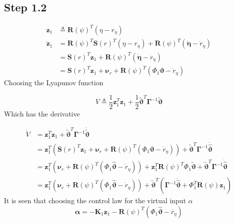 \documentclass[12pt,a4]{article}
\begin{document}
\subsection{Step 1.2}
\begin{align}
	\bm{z}_1       & \triangleq \bm{R}(\psi)^T(\eta - r_{\eta})                                                      \\
	\bm{\dot{z}}_1 & = \bm{R}(\psi)^T\bm{S}(r)^T(\eta - r_{\eta}) + \bm{R}(\psi)^T(\bm{\dot{\eta}} - \dot{r}_{\eta}) \\
	               & = \bm{S}(r)^T\bm{z}_1 + \bm{R}(\psi)^T(\bm{\dot{\eta}} - \dot{r}_{\eta})                        \\
	               & = \bm{S}(r)^T\bm{z}_1 + \bm{\nu}_r + \bm{R}(\psi)^T(\Phi_1\bm{\vartheta}- \dot{r}_{\eta})
\end{align}
Choosing the Lyapunov function

\begin{equation}
	V \triangleq \frac{1}{2}\bm{z}_1^T\bm{z}_1 + \frac{1}{2}\bm{\tilde{\vartheta}}^T\bm{\Gamma}^{-1}\bm{\tilde{\vartheta}}
\end{equation}
Which has the derivative

\begin{align}
	\dot{V} & = \bm{z}_1^T\dot{\bm{z}}_1
	+ \bm{\tilde{\vartheta}} ^T\bm{\Gamma}^{-1}\bm{\dot{\tilde{\vartheta}}}                                                      \\
	        & = \bm{z}_1^T\left( \bm{S}(r)^T\bm{z}_1 + \bm{\nu}_r + \bm{R}(\psi)^T(\Phi_1\bm{\vartheta}- \dot{r}_{\eta}) \right)
	+ \bm{\tilde{\vartheta}} ^T\bm{\Gamma}^{-1}\bm{\dot{\hat{\vartheta}}}                                                        \\
	        & = \bm{z}_1^T\left(\bm{\nu}_r + \bm{R}(\psi)^T(\Phi_1\bm{\hat{\vartheta}}- \dot{r}_{\eta}) \right)
	+ \bm{z}_1^T\bm{R}(\psi)^T\Phi_1\bm{\tilde{\vartheta}} + \bm{\tilde{\vartheta}} ^T\bm{\Gamma}^{-1}\bm{\dot{\hat{\vartheta}}} \\
	        & = \bm{z}_1^T\left(\bm{\nu}_r + \bm{R}(\psi)^T(\Phi_1\bm{\hat{\vartheta}}- \dot{r}_{\eta}) \right)
	+ \bm{\tilde{\vartheta}} ^T \left(\bm{\Gamma}^{-1}\bm{\dot{\hat{\vartheta}}} +  \Phi_1^T\bm{R}(\psi)\bm{z}_1	\right)
\end{align}
It is seen that choosing the control law for the virtual input $\alpha$
\begin{equation}
	\bm{\alpha} = -\bm{K}_1\bm{z}_1 - \bm{R}(\psi)^T  \left( \Phi_1 \bm{\hat{\vartheta}} - \dot{r_{\eta}} \right)
\end{equation}
\end{document}
